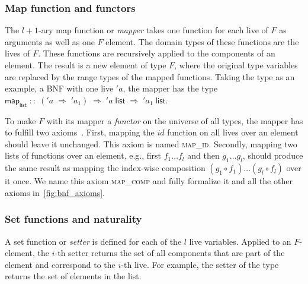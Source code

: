       \subsubsection{Map function and functors}
        The $l+1$-ary map function or \textit{mapper} takes one function for each live of $F$ as arguments as well as one $F$ element. The domain types of these functions are the lives of $F$. These functions are recursively applied to the components of an element. The result is a new element of type $F$, where the original type variables are replaced by the range types of the mapped functions. Taking the  type as an example, a \ac{BNF} with one live $'a$, the mapper has the type $\textsf{map}_\textsf{list}\; ::\; ('a\; \Rightarrow\; 'a_1)\; \Rightarrow\; 'a\; \textsf{list}\; \Rightarrow\; 'a_1\; \textsf{list}$.
        
        To make $F$ with its mapper a \textit{functor} on the universe of all types, the mapper has to fulfill two axioms~\cite{traytel2012foundational}. First, mapping the $id$ function on all lives over an element should leave it unchanged. This axiom is named \textsc{map\_id}. Secondly, mapping two lists of functions over an element, e.g., first $f_1 \dots f_l$ and then $g_1 \dots g_l$, should produce the same result as mapping the index-wise composition $(g_1 \circ f_1) \dots (g_l \circ f_l)$ over it once. We name this axiom \textsc{map\_comp} and fully formalize it and all the other axioms in~\autoref{fig:bnf_axioms}.

      \subsubsection{Set functions and naturality}
        A set function or \textit{setter} is defined for each of the $l$ live variables. Applied to an $F$-element, the $i$-th setter returns the set of all components that are part of the element and correspond to the $i$-th live. For example, the setter of the  type returns the set of elements in the list. 

